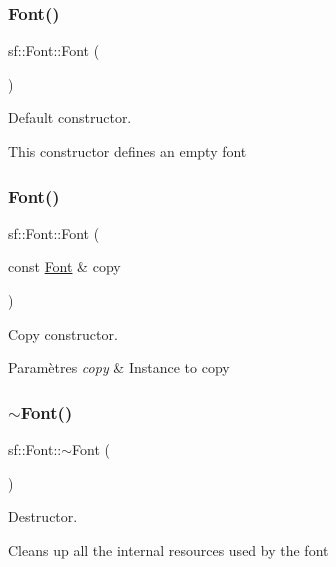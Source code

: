 \subsubsection{\texorpdfstring{Font()}{Font()}\hspace{0.1cm}{\footnotesize\ttfamily [1/2]}}
{\footnotesize\ttfamily sf\+::\+Font\+::\+Font (\begin{DoxyParamCaption}{ }\end{DoxyParamCaption})}



Default constructor. 

This constructor defines an empty font \mbox{\label{classsf_1_1Font_a72d7322b355ee2f1be4500f530e98081}} 
\subsubsection{\texorpdfstring{Font()}{Font()}\hspace{0.1cm}{\footnotesize\ttfamily [2/2]}}
{\footnotesize\ttfamily sf\+::\+Font\+::\+Font (\begin{DoxyParamCaption}\item[{const \hyperlink{classsf_1_1Font}{Font} \&}]{copy }\end{DoxyParamCaption})}



Copy constructor. 


\begin{DoxyParams}{Paramètres}
{\em copy} & Instance to copy \\
\hline
\end{DoxyParams}
\mbox{\label{classsf_1_1Font_aa18a3c62e6e01e9a21c531b5cad4b7f2}} 
\subsubsection{\texorpdfstring{$\sim$\+Font()}{~Font()}}
{\footnotesize\ttfamily sf\+::\+Font\+::$\sim$\+Font (\begin{DoxyParamCaption}{ }\end{DoxyParamCaption})}



Destructor. 

Cleans up all the internal resources used by the font 

